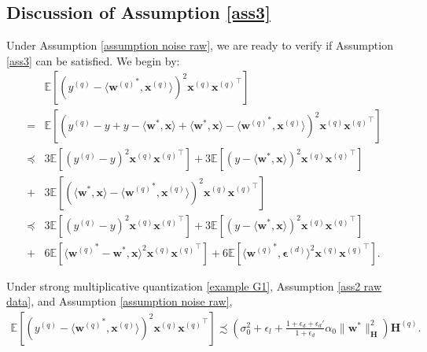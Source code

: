 \documentclass[11pt, letterpaper]{article}
\begin{document}
\subsection{Discussion of Assumption \ref{ass3}}
Under Assumption \ref{assumption noise raw}, we are ready to verify if Assumption \ref{ass3} can be satisfied. We begin by:
\begin{equation}
\label{G8}
    \begin{aligned}
        &\mathbb{E}\left[(y^{(q)}-\langle {\mathbf{w}^{(q)}}^*,\mathbf{x}^{(q)}\rangle)^2{\mathbf{x}^{(q)}}{\mathbf{x}^{(q)}}^\top\right]\\
        = & \mathbb{E}\left[(y^{(q)}-y+y-\langle \mathbf{w}^*,\mathbf{x}\rangle+\langle \mathbf{w}^*,\mathbf{x}\rangle-\langle {\mathbf{w}^{(q)}}^*,\mathbf{x}^{(q)}\rangle)^2{\mathbf{x}^{(q)}}{\mathbf{x}^{(q)}}^\top\right]\\
        \preceq &3\mathbb{E}\left[(y^{(q)}-y)^2{\mathbf{x}^{(q)}}{\mathbf{x}^{(q)}}^\top\right]+3\mathbb{E}\left[(y-\langle \mathbf{w}^*,\mathbf{x}\rangle)^2{\mathbf{x}^{(q)}}{\mathbf{x}^{(q)}}^\top\right]\\
        +&3\mathbb{E}\left[(\langle \mathbf{w}^*,\mathbf{x}\rangle-\langle {\mathbf{w}^{(q)}}^*,\mathbf{x}^{(q)}\rangle)^2{\mathbf{x}^{(q)}}{\mathbf{x}^{(q)}}^\top\right]\\
        \preceq &3\mathbb{E}\left[(y^{(q)}-y)^2{\mathbf{x}^{(q)}}{\mathbf{x}^{(q)}}^\top\right]+3\mathbb{E}\left[(y-\langle \mathbf{w}^*,\mathbf{x}\rangle)^2{\mathbf{x}^{(q)}}{\mathbf{x}^{(q)}}^\top\right]\\
        +& 6\mathbb{E}\left[\langle {\mathbf{w}^{(q)}}^*- \mathbf{w}^*,\mathbf{x}\rangle^2{\mathbf{x}^{(q)}}{\mathbf{x}^{(q)}}^\top\right]+6\mathbb{E}\left[\langle {\mathbf{w}^{(q)}}^*,\boldsymbol{\epsilon}^{(d)}\rangle^2{\mathbf{x}^{(q)}}{\mathbf{x}^{(q)}}^\top\right].
    \end{aligned}
\end{equation}
\begin{lemma}
    Under strong multiplicative quantization \ref{example G1}, Assumption \ref{ass2 raw data}, and Assumption \ref{assumption noise raw},
    \begin{equation*}
        \begin{aligned}
            \mathbb{E}\left[(y^{(q)}-\langle {\mathbf{w}^{(q)}}^*,\mathbf{x}^{(q)}\rangle)^2{\mathbf{x}^{(q)}}{\mathbf{x}^{(q)}}^\top\right]
            \precsim \left(\sigma_0^2+\epsilon_l+\frac{1+\epsilon_d+\epsilon_d'}{1+\epsilon_d}\alpha_0\|\mathbf{w}^*\|_\mathbf{H}^2\right)\mathbf{H}^{(q)}.
        \end{aligned}
    \end{equation*}
\end{lemma}
\end{document}
